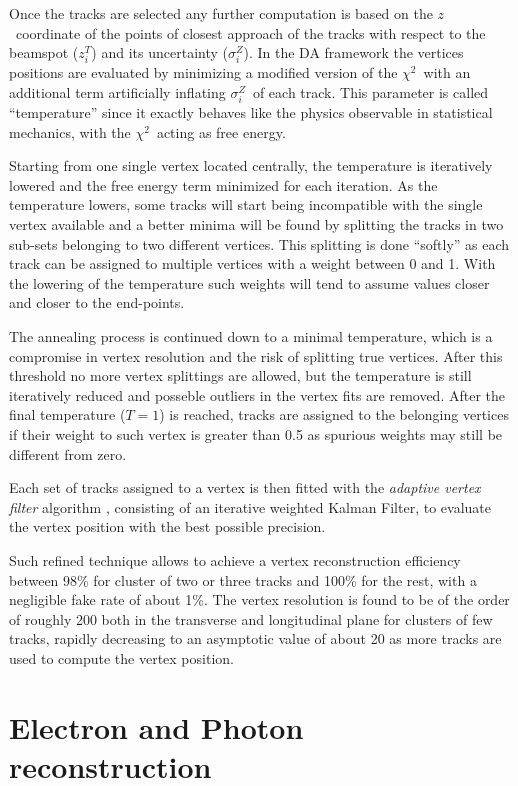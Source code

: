 Once the tracks are selected any further computation is based on the $z$\ coordinate of the points of closest approach of the tracks with respect to the beamspot ($z_i^T$) and its uncertainty ($\sigma_i^Z$). In the DA framework the vertices positions are evaluated by minimizing a modified version of the $\chi^2$\ with an additional term artificially inflating $\sigma_i^Z$\ of each track. This parameter is called ``temperature'' since it exactly behaves like the physics observable in statistical mechanics, with the  $\chi^2$\ acting as free energy.

Starting from one single vertex located centrally, the temperature is iteratively lowered and the free energy term minimized for each iteration. As the temperature lowers, some tracks will start being incompatible with the single vertex available and a better minima will be found by splitting the tracks in two sub-sets belonging to two different vertices. This splitting is done ``softly'' as each track can be assigned to multiple vertices with a weight between 0 and 1. With the lowering of the temperature such weights will tend to assume values closer and closer to the end-points.

The annealing process is continued down to a minimal temperature, which is a compromise in vertex resolution and the risk of splitting true vertices. After this threshold no more vertex splittings are allowed, but the temperature is still iteratively reduced and posseble outliers in the vertex fits are removed. After the final temperature ($T=1$) is reached, tracks are assigned to the belonging vertices if their weight to such vertex is greater than 0.5 as spurious weights may still be different from zero. 

Each set of tracks assigned to a vertex is then fitted with the \emph{adaptive vertex filter} algorithm \cite{CMS_NOTE_2007-008}, consisting of an iterative weighted Kalman Filter, to evaluate the vertex position with the best possible precision.

Such refined technique allows to achieve a vertex reconstruction efficiency between 98\% for cluster  of two or three tracks and 100\% for the rest, with a negligible fake rate of about 1\%. The vertex resolution is found to be of the order of roughly 200 \um both in the transverse and longitudinal plane for clusters of few tracks, rapidly decreasing to an asymptotic value of about 20 \um as more tracks are used to compute the vertex position.

\section{Electron and Photon reconstruction}

